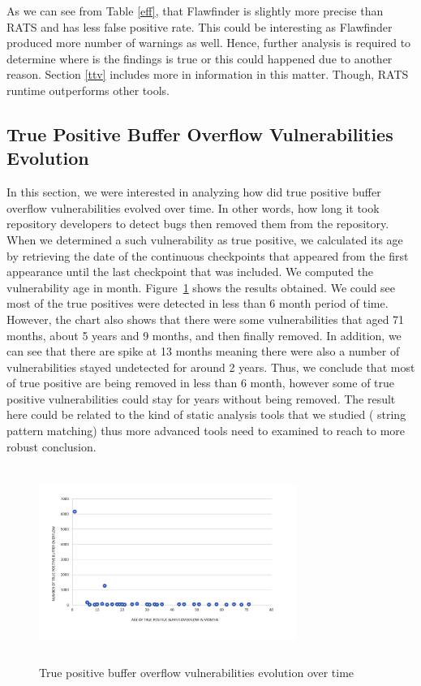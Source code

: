As we can see from Table \ref{eff},  that Flawfinder is slightly more precise than RATS and has less false positive rate.  This could be interesting as Flawfinder produced more number of warnings as well. Hence, further analysis is required to determine where is the findings is true or this could happened due to another reason. Section \ref{ttv} includes more in information in this matter. Though, RATS runtime outperforms other tools. 



\subsection{True Positive Buffer Overflow Vulnerabilities Evolution}
In this section, we were interested in analyzing how did  true positive buffer overflow vulnerabilities evolved over time. In other words,  how long it took repository developers to  detect bugs then removed them from the repository. When we determined a such vulnerability as true positive,  we calculated its age by retrieving the date of the continuous checkpoints that appeared from the first appearance until the last checkpoint that was included. We computed the vulnerability age in month.  Figure~\ref{chart} shows the results obtained. We could see most of the true positives were detected in less than 6 month period of time. However, the chart also shows that there were some vulnerabilities that aged 71 months, about 5 years and 9 months, and then finally removed. In addition, we can see that there are spike at 13 months meaning there were also a number of vulnerabilities stayed undetected for around 2 years. Thus, we conclude that most of true positive are being removed in less than 6 month, however some of true positive vulnerabilities could stay for years without being removed. The result here could be related to the kind of static analysis tools that we studied ( string pattern matching) thus more advanced tools need to examined to reach to more robust conclusion.



\begin{figure} [h!]
\centering
\includegraphics[height=2.5in, width=3.3in]{chart.png}
\caption{True positive buffer overflow vulnerabilities evolution over time}
\label{chart}
\end{figure}




